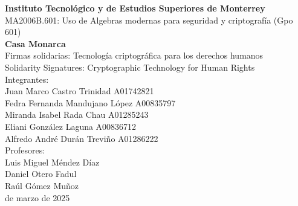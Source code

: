 \begin{center}
\Large{\textbf{Instituto Tecnológico y de Estudios Superiores de Monterrey}}\\
\Large{MA2006B.601: Uso de Algebras modernas para seguridad y criptografía (Gpo 601)}\\
\Large{\textbf{Casa Monarca}}\\
\Large{\fontsize{13pt}{12pt}\selectfont
Firmas solidarias: Tecnología criptográfica para los derechos humanos}\\ %
\Large{\fontsize{13pt}{12pt}\selectfont
Solidarity Signatures: Cryptographic Technology for Human Rights}\\ %
\Large{Integrantes:}\\ 
\fontsize{12pt}{12pt}\selectfont
Juan Marco Castro Trinidad A01742821\\
Fedra Fernanda Mandujano López A00835797\\
Miranda Isabel Rada Chau A01285243\\
Eliani González Laguna A00836712\\
Alfredo André Durán Treviño A01286222\\
\Large{Profesores:}\\ 
\fontsize{12pt}{12pt}\selectfont %
Luis Miguel Méndez Díaz\\
Daniel Otero Fadul\\
Raúl Gómez Muñoz \\
\fontsize{17pt}{12pt} de marzo de 2025


\end{center}
\newpage
